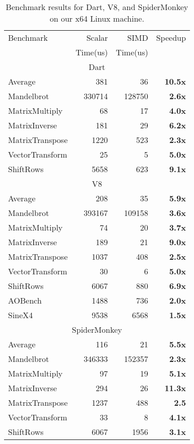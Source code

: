 \documentclass{sigplanconf}
\begin{document}
\begin{table}
\begin{center}
\begin{tabular}{|l|r|r|r|}
\hline
 Benchmark & Scalar   & SIMD     & Speedup \\
           & Time(us) & Time(us) &         \\
\hline
\hline
\multicolumn{4}{c}{Dart} \\
\hline
 Average & 381 & 36 & \textbf{10.5x} \\
\hline
 Mandelbrot & 330714 & 128750 & \textbf{2.6x} \\
\hline
 MatrixMultiply & 68 & 17 & \textbf{4.0x} \\
\hline
 MatrixInverse & 181 & 29 & \textbf{6.2x} \\
\hline
 MatrixTranspose & 1220 & 523 & \textbf{2.3x} \\
\hline
 VectorTransform & 25 & 5 & \textbf{5.0x} \\
\hline
 ShiftRows & 5658 & 623 & \textbf{9.1x} \\
\hline
\hline
\multicolumn{4}{c}{V8} \\
\hline
 Average & 208 & 35 & \textbf{5.9x} \\
 \hline
 Mandelbrot & 393167 & 109158 & \textbf{3.6x} \\
 \hline
 MatrixMultiply & 74 & 20 & \textbf{3.7x} \\
 \hline
 MatrixInverse & 189 & 21 & \textbf{9.0x} \\
 \hline
 MatrixTranspose & 1037 & 408 & \textbf{2.5x} \\
 \hline
 VectorTransform & 30 & 6 & \textbf{5.0x} \\
 \hline
 ShiftRows & 6067 & 880 & \textbf{6.9x} \\
 \hline
 AOBench & 1488 & 736 & \textbf{2.0x} \\
 \hline
 SineX4 & 9538 & 6568 & \textbf{1.5x} \\
 \hline
\hline
\multicolumn{4}{c}{SpiderMonkey} \\
\hline
 Average & 116 & 21 & \textbf{5.5x} \\
 \hline
 Mandelbrot & 346333 & 152357 & \textbf{2.3x} \\
 \hline
 MatrixMultiply & 97 & 19 & \textbf{5.1x} \\
 \hline
 MatrixInverse & 294 & 26 & \textbf{11.3x} \\
 \hline
 MatrixTranspose & 1237 & 488 & \textbf{2.5} \\
 \hline
 VectorTransform & 33 & 8 & \textbf{4.1x} \\
 \hline
 ShiftRows & 6067 & 1956 & \textbf{3.1x} \\
 \hline
\end{tabular}
\end{center}
\caption{Benchmark results for Dart, V8, and SpiderMonkey on our x64 Linux
machine.}
\label{tab:x64-benchmarks}
\end{table}
\end{document}
